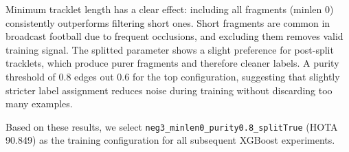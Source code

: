 Minimum tracklet length has a clear effect: including all fragments (minlen 0) consistently outperforms filtering short ones. Short fragments are common in broadcast football due to frequent occlusions, and excluding them removes valid training signal. The splitted parameter shows a slight preference for post-split tracklets, which produce purer fragments and therefore cleaner labels. A purity threshold of 0.8 edges out 0.6 for the top configuration, suggesting that slightly stricter label assignment reduces noise during training without discarding too many examples.

Based on these results, we select \texttt{neg3\_minlen0\_purity0.8\_splitTrue} (HOTA 90.849) as the training configuration for all subsequent XGBoost experiments.

